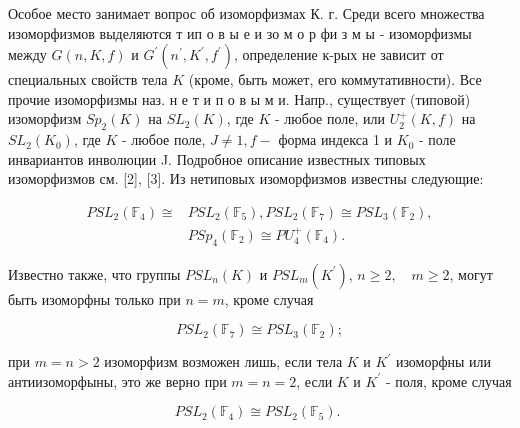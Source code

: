 \documentclass[10pt]{article}
\begin{document}
Особое место занимает вопрос об изоморфизмах К. г. Среди всего множества изоморфизмов выделяются т ип о в ы е и зо м о р фи з м ы - изоморфизмы между $G(n, K, f)$ и $G^{\prime}\left(n^{\prime}, K^{\prime}, f^{\prime}\right)$, определение к-рых не зависит от специальных свойств тела $K$ (кроме, быть может, его коммутативности). Все прочие изоморфизмы наз. н е т и п о в ы м и. Напр., существует (типовой) изоморфизм $S p_{2}(K)$ на $S L_{2}(K)$, где $K$ - любое поле, или $U_{2}^{+}(K, f)$ на $S L_{2}\left(K_{0}\right)$, где $K$ - любое поле, $J \neq 1, f-$ форма индекса 1 и $K_{0}$ - поле инвариантов инволюции J. Подробное описание известных типовых изоморфизмов см. [2], [3]. Из нетиповых изоморфизмов известны следующие:



\[

\begin{aligned}

P S L_{2}\left(\mathbb{F}_{4}\right) \cong & P S L_{2}\left(\mathbb{F}_{5}\right), P S L_{2}\left(\mathbb{F}_{7}\right) \cong P S L_{3}\left(\mathbb{F}_{2}\right), \\

& P S p_{4}\left(\mathbb{F}_{2}\right) \cong P U_{4}^{+}\left(\mathbb{F}_{4}\right) .

\end{aligned}

\]



Известно также, что группы $P S L_{n}(K)$ и $P S L_{m}\left(K^{\prime}\right)$, $n \geqslant 2, \quad m \geqslant 2$, могут быть изоморфны только при $n=m$, кроме случая



\[

P S L_{2}\left(\mathbb{F}_{7}\right) \cong P S L_{3}\left(\mathbb{F}_{2}\right) ;

\]



при $m=n>2$ изоморфизм возможен лишь, если тела $K$ и $K^{\prime}$ изоморфны или антиизоморфыны, это же верно при $m=n=2$, если $K$ и $K^{\prime}$ - поля, кроме случая



\[

P S L_{2}\left(\mathbb{F}_{4}\right) \cong P S L_{2}\left(\mathbb{F}_{5}\right) \text {. }

\]
\end{document}
